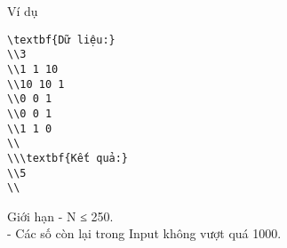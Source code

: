 Ví dụ  
\begin{verbatim}
\textbf{Dữ liệu:}
\\3
\\1 1 10
\\10 10 1
\\0 0 1
\\0 0 1
\\1 1 0
\\
\\\textbf{Kết quả:}
\\5
\\\end{verbatim}
   Giới hạn  
- N ≤ 250.   
\\   - Các số còn lại trong Input không vượt quá 1000.